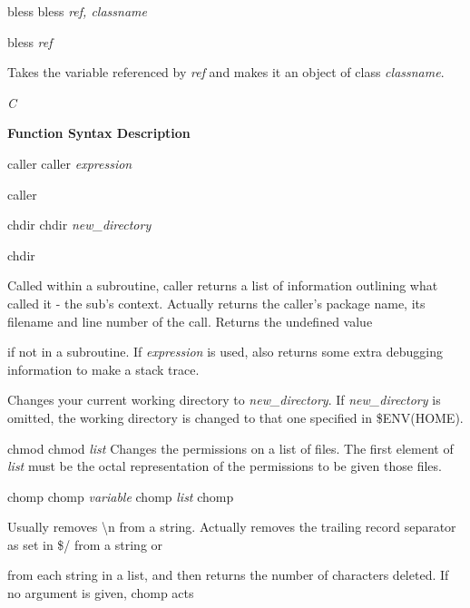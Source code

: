 \documentclass[a4paper,11pt]{book}
\begin{document}
\noindent bless bless \textit{ref, classname}

\noindent 

\noindent bless \textit{ref}

\noindent 

\noindent Takes the variable referenced by \textit{ref }and makes it an object of class \textit{classname}.

\noindent 

\noindent 

\noindent \textit{C}

\noindent 

\noindent \textbf{Function Syntax Description}

\noindent 

\noindent caller caller \textit{expression}

\noindent caller

\noindent 

\noindent 

\noindent 

\noindent 

\noindent chdir chdir \textit{new\_directory}

\noindent chdir

\noindent 

\noindent Called within a subroutine, caller returns a list of information outlining what called it - the sub's context. Actually returns the caller's package name, its filename and line number of the call. Returns the undefined value

\noindent if not in a subroutine. If \textit{expression }is used, also returns some extra debugging information to make a stack trace.

\noindent Changes your current working directory to \textit{new\_directory}. If \textit{new\_directory }is omitted, the working directory is changed to that one specified in \$ENV(HOME).

\noindent chmod chmod \textit{list }Changes the permissions on a list of files. The first element of \textit{list }must be the octal representation of the permissions to be given those files.

\noindent chomp chomp \textit{variable }chomp \textit{list }chomp

\noindent 

\noindent Usually removes \textbackslash n from a string. Actually removes the trailing record separator as set in \$/ from a string or

\noindent from each string in a list, and then returns the number of characters deleted. If no argument is given, chomp acts
\end{document}
